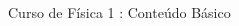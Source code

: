 \documentclass[DIV=calc, paper=a4, fontsize=11pt, twocolumn]{scrartcl}	 %
\begin{document}
\begin{thebibliography}{99} %

\newblock Curso de Física 1 : Conteúdo Básico
 
\end{thebibliography}


\end{document}
